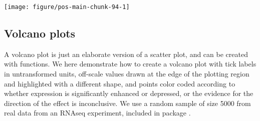 \documentclass[krantz2]{krantz}\usepackage{knitr}%
\begin{document}
\begin{knitrout}\footnotesize
{}\color{fgcolor}\begin{kframe}
\begin{alltt}
\hlstd{(}   \hlopt{+}
    \hlstd{(} \hlstd{=} \hlstd{)} \hlopt{+}
    \hlstd{(} \hlstd{=} \hlstd{)} \hlopt{+}
    \hlstd{(} \hlstd{=} \hlstd{)} \hlopt{+}
    \hlstd{(} \hlstd{=} \hlstd{)} \hlopt{+}
    \hlstd{(} \hlstd{=} \hlstd{)} \hlopt{+}
    \hlstd{(} \hlstd{=} \hlopt{-}\hlstd{,}  \hlstd{=} \hlopt{-}\hlstd{)} \hlopt{+}
    \hlstd{(} \hlstd{=} \hlopt{+}\hlstd{,}  \hlstd{=} \hlopt{+}\hlstd{)} \hlopt{+}
    \hlstd{()}
\end{alltt}
\end{kframe}

{\centering \texttt{[image: figure/pos-main-chunk-94-1]} 

}



\end{knitrout}

\subsection{Volcano plots}\label{sec:plot:volcano}

A volcano plot is just an elaborate version of a scatter plot, and can be created with \ggplot functions.
We here demonstrate how to create a volcano plot with tick labels in untransformed units, off-scale values drawn at the edge of the plotting region and highlighted with a different shape, and points color coded according to whether expression is significantly enhanced or depressed, or the evidence for the direction of the effect is inconclusive. We use a random sample of size 5000 from real data from an RNAseq experiment, included in package .
\end{document}
